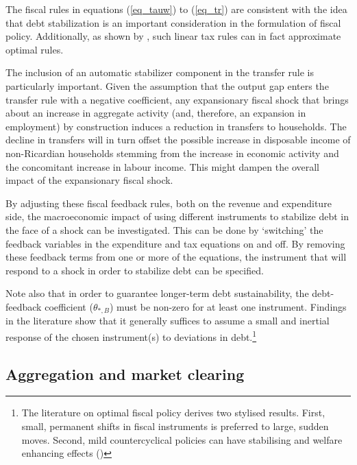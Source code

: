 \documentclass[a4paper,11pt]{article}
\numberwithin{equation}{section}
\begin{document}
	The fiscal rules in equations (\ref{eq_tauw}) to (\ref{eq_tr}) are consistent with the idea that debt stabilization is an important consideration in the formulation of fiscal policy. Additionally, as shown by \cite{ravn2007}, such linear tax rules can in fact approximate optimal rules.
	
	The inclusion of an automatic stabilizer component in the transfer rule is particularly important. Given the assumption that the output gap enters the transfer rule with a negative coefficient, any expansionary fiscal shock that brings about an increase in aggregate activity (and, therefore, an expansion in employment) by construction induces a reduction in transfers to households. The decline in transfers will in turn offset the possible increase in disposable income of non-Ricardian households stemming from the increase in economic activity and the concomitant increase in labour income. This might dampen the overall impact of the expansionary fiscal shock.
	
	By adjusting these fiscal feedback rules, both on the revenue and expenditure side, the macroeconomic impact of using different instruments to stabilize debt in the face of a shock can be investigated. This can be done by `switching' the feedback variables in the expenditure and tax equations on and off. By removing these feedback terms from one or more of the equations, the instrument that will respond to a shock in order to stabilize debt can be specified.
	
	Note also that in order to guarantee longer-term debt sustainability, the debt-feedback coefficient ($\theta_{*,B}$) must be non-zero for at least one instrument. Findings in the literature show that it generally suffices to assume a small and inertial response of the chosen instrument(s) to deviations in debt.\footnote{The literature on optimal fiscal policy derives two stylised results. First, small, permanent shifts in fiscal instruments is preferred to large, sudden moves. Second, mild countercyclical policies can have stabilising and welfare enhancing effects (\citealp{stahler2012})} 
	
	
	\subsection{Aggregation and market clearing} \label{market_clear}
	
\end{document}
